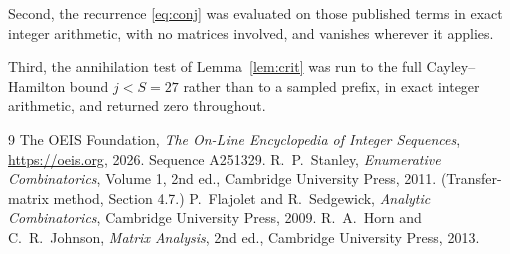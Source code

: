 \documentclass[11pt,a4paper]{article}
\theoremstyle{plain}
\theoremstyle{definition}
\begin{document}
Second, the recurrence \eqref{eq:conj} was evaluated on those published terms in exact
integer arithmetic, with no matrices involved, and vanishes wherever it applies.

Third, the annihilation test of Lemma~\ref{lem:crit} was run to the full Cayley--Hamilton
bound $j<S=27$ rather than to a sampled prefix, in exact integer arithmetic, and returned
zero throughout.

\begin{thebibliography}{9}
 The OEIS Foundation, \emph{The On-Line Encyclopedia of Integer
Sequences}, \url{https://oeis.org}, 2026. Sequence A251329.
 R.~P.~Stanley, \emph{Enumerative Combinatorics}, Volume 1, 2nd ed.,
Cambridge University Press, 2011. (Transfer-matrix method, Section 4.7.)
 P.~Flajolet and R.~Sedgewick, \emph{Analytic Combinatorics}, Cambridge
University Press, 2009.
 R.~A.~Horn and C.~R.~Johnson, \emph{Matrix Analysis}, 2nd ed., Cambridge
University Press, 2013.
\end{thebibliography}
\end{document}
